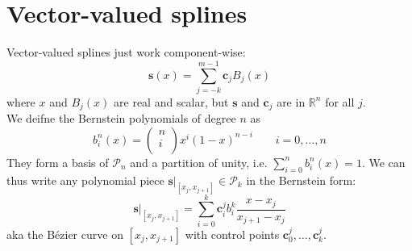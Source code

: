 \documentclass[12pt, openany]{report}
\newcommand{\R}{\mathbb{R}}
\theoremstyle{definition}
\begin{document}
\section{Vector-valued splines}
Vector-valued splines just work component-wise:
\begin{equation}
    \textbf{s}(x) = \sum_{j=-k}^{m-1}\textbf{c}_jB_j(x)
\end{equation}
where $x$ and $B_j(x)$ are real and scalar, but $\textbf{s}$ and $\textbf{c}_j$ are in $\R^n$ for all $j$.\\
We deifne the Bernstein polynomials of degree $n$ as 
\begin{equation}
    b_i^n(x) = \begin{pmatrix}
        n\\i\\
    \end{pmatrix} x^i(1-x)^{n-i}\qquad i=0,\dots,n
\end{equation}
They form a basis of $\mathcal{P}_n$ and a partition of unity, i.e. $\sum_{i=0}^nb_i^n(x) = 1$. We can thus write any polynomial piece $\textbf{s}|_{[x_j,x_{j+1}]}\in \mathcal{P}_k$ in the Bernstein form:
\begin{equation}
    \textbf{s}|_{[x_j,x_{j+1}]} = \sum_{i=0}^k\textbf{c}_i^jb_i^k\frac{x-x_j}{x_{j+1}-x_j}
\end{equation}
aka the Bézier curve on $[x_j,x_{j+1}]$ with control points $\textbf{c}_0^j,\dots, \textbf{c}_k^j$.
\end{document}
